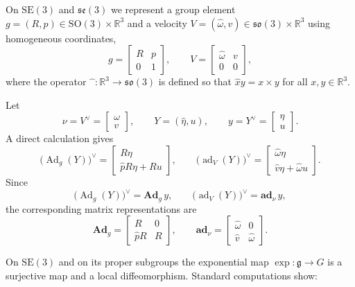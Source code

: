 \documentclass[10pt,twocolumn]{article}
\newenvironment{revision}{\color{red}}{}
\newcommand{\bAd}{\mathbf{Ad}}
\newcommand{\bad}{\mathbf{ad}}
\newcommand{\SO}{\mathrm{SO}}
\newcommand{\SE}{\mathrm{SE}}
\newcommand{\so}{\mathfrak{so}}
\newcommand{\se}{\mathfrak{se}}
\newcommand{\gfrak}{\mathfrak g}
\newcommand{\Ad}{\operatorname{Ad}}
\newcommand{\ad}{\operatorname{ad}}
\newcommand{\R}{\mathbb R}
\begin{document}
On $\SE(3)$ and $\se(3)$ we represent a group element $g=(R,p)\in\SO(3)\times\R^3$ and a velocity $V=(\widehat\omega,v)\in\so(3)\times\R^3$ using homogeneous coordinates,
\begin{equation*}
g=\begin{bmatrix}R&p\\0&1\end{bmatrix},
\qquad
V=\begin{bmatrix}\widehat\omega&v\\0&0\end{bmatrix},
\end{equation*}
where the operator $\widehat{\phantom{x}}:\R^3\to\so(3)$ is defined so that $\widehat{x}y=x\times y$ for all $x,y\in\R^3$.
\begin{revision}

Let
\[
\nu=V^\vee=\begin{bmatrix}\omega\\v\end{bmatrix},
\qquad
Y=(\widehat\eta,u),\qquad
y=Y^\vee=\begin{bmatrix}\eta\\u\end{bmatrix}.
\]
A direct calculation gives
\[
\bigl(\Ad_g(Y)\bigr)^\vee
=
\begin{bmatrix}
R\eta\\
\widehat pR\eta+Ru
\end{bmatrix},
\qquad
\bigl(\ad_V(Y)\bigr)^\vee
=
\begin{bmatrix}
\widehat\omega\eta\\
\widehat v\eta+\widehat\omega u
\end{bmatrix}.
\]
Since
\[
\bigl(\Ad_g(Y)\bigr)^\vee=\bAd_g\,y,
\qquad
\bigl(\ad_V(Y)\bigr)^\vee=\bad_\nu\,y,
\]
the corresponding matrix representations are
\[
\bAd_g=
\begin{bmatrix}
R&0\\
\widehat pR&R
\end{bmatrix},
\qquad
\bad_\nu=
\begin{bmatrix}
\widehat\omega&0\\
\widehat v&\widehat\omega
\end{bmatrix}.
\]

\end{revision}

On $\SE(3)$ and on its proper subgroups the exponential map $\exp:\gfrak\to G$ is a surjective map and a local diffeomorphism. Standard computations show:
\end{document}
